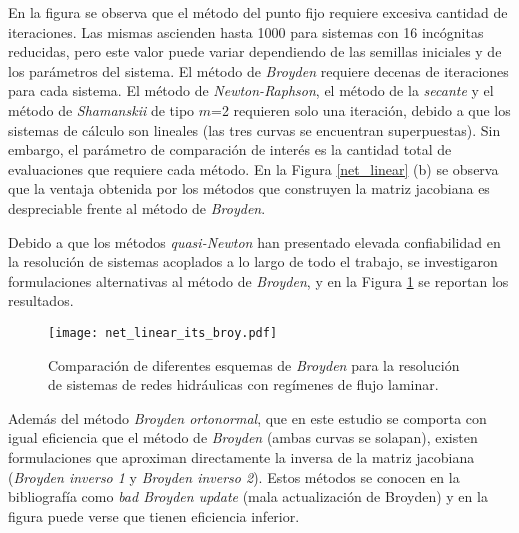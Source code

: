 En la figura se observa que el método del punto fijo requiere excesiva cantidad de iteraciones.
Las mismas ascienden hasta 1000 para sistemas con 16 incógnitas reducidas,
pero este valor puede variar dependiendo de las semillas iniciales y de los parámetros del sistema.
El método de \textit{Broyden} requiere decenas de iteraciones para cada sistema.
El método de \textit{Newton-Raphson}, el método de la \textit{secante}
y el método de \textit{Shamanskii} de tipo $m$=2
requieren solo una iteración, debido a que los sistemas de cálculo son lineales
(las tres curvas se encuentran superpuestas).
Sin embargo, el parámetro de comparación de interés es la cantidad total de evaluaciones que requiere cada método.
En la Figura \ref{net_linear} (b) se observa que la ventaja obtenida por los métodos que construyen la matriz jacobiana es despreciable frente al método de \textit{Broyden}.

Debido a que los métodos \textit{quasi-Newton} han presentado elevada confiabilidad en la resolución de sistemas acoplados a lo largo de todo el trabajo,
se investigaron formulaciones alternativas al método de \textit{Broyden},
y en la Figura \ref{net_linear_its_broy} se reportan los resultados.

\begin{figure}[ht]
\centering
\texttt{[image: net\_linear\_its\_broy.pdf]}
\caption[Comparación de diferentes esquemas de \textit{Broyden} para la resolución de sistemas de redes hidráulicas con regímenes de flujo laminar]
{Comparación de diferentes esquemas de \textit{Broyden} para la resolución de sistemas de redes hidráulicas con regímenes de flujo laminar.}
	\label{net_linear_its_broy}
\end{figure}

Además del método \textit{Broyden ortonormal}, que en este estudio se comporta con igual eficiencia que el método de \textit{Broyden} (ambas curvas se solapan),
existen formulaciones que aproximan directamente la inversa de la matriz jacobiana (\textit{Broyden inverso 1} y \textit{Broyden inverso 2}).
Estos métodos se conocen en la bibliografía como \textit{bad Broyden update} (mala actualización de Broyden) \cite{griewank} y en la figura puede verse que tienen eficiencia inferior.

